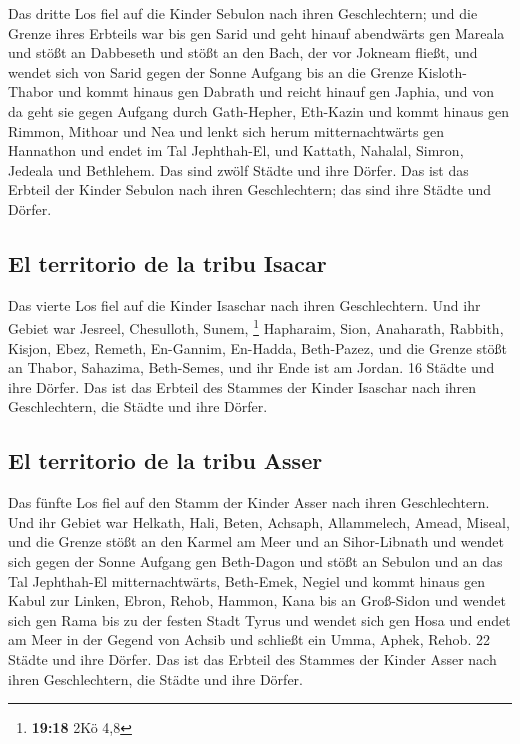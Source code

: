  Das dritte Los fiel auf die Kinder Sebulon nach ihren
Geschlechtern; und die Grenze ihres Erbteils war bis gen Sarid
 und geht hinauf abendwärts gen Mareala und stößt an
Dabbeseth und stößt an den Bach, der vor Jokneam fließt, 
und wendet sich von Sarid gegen der Sonne Aufgang bis an die Grenze
Kisloth-Thabor und kommt hinaus gen Dabrath und reicht hinauf gen
Japhia,  und von da geht sie gegen Aufgang durch
Gath-Hepher, Eth-Kazin und kommt hinaus gen Rimmon, Mithoar und Nea
 und lenkt sich herum mitternachtwärts gen Hannathon und
endet im Tal Jephthah-El,  und Kattath, Nahalal, Simron,
Jedeala und Bethlehem. Das sind zwölf Städte und ihre Dörfer.
 Das ist das Erbteil der Kinder Sebulon nach ihren
Geschlechtern; das sind ihre Städte und Dörfer.

\hypertarget{el-territorio-de-la-tribu-isacar}{%
\subsection{El territorio de la tribu
Isacar}\label{el-territorio-de-la-tribu-isacar}}

 Das vierte Los fiel auf die Kinder Isaschar nach ihren
Geschlechtern.  Und ihr Gebiet war Jesreel, Chesulloth,
Sunem, \footnote{\textbf{19:18} 2Kö 4,8}  Hapharaim,
Sion, Anaharath,  Rabbith, Kisjon, Ebez, 
Remeth, En-Gannim, En-Hadda, Beth-Pazez,  und die Grenze
stößt an Thabor, Sahazima, Beth-Semes, und ihr Ende ist am Jordan. 16
Städte und ihre Dörfer.  Das ist das Erbteil des Stammes
der Kinder Isaschar nach ihren Geschlechtern, die Städte und ihre
Dörfer.

\hypertarget{el-territorio-de-la-tribu-asser}{%
\subsection{El territorio de la tribu
Asser}\label{el-territorio-de-la-tribu-asser}}

 Das fünfte Los fiel auf den Stamm der Kinder Asser nach
ihren Geschlechtern.  Und ihr Gebiet war Helkath, Hali,
Beten, Achsaph,  Allammelech, Amead, Miseal, und die
Grenze stößt an den Karmel am Meer und an Sihor-Libnath 
und wendet sich gegen der Sonne Aufgang gen Beth-Dagon und stößt an
Sebulon und an das Tal Jephthah-El mitternachtwärts, Beth-Emek, Negiel
und kommt hinaus gen Kabul zur Linken,  Ebron, Rehob,
Hammon, Kana bis an Groß-Sidon  und wendet sich gen Rama
bis zu der festen Stadt Tyrus und wendet sich gen Hosa und endet am Meer
in der Gegend von Achsib  und schließt ein Umma, Aphek,
Rehob. 22 Städte und ihre Dörfer.  Das ist das Erbteil
des Stammes der Kinder Asser nach ihren Geschlechtern, die Städte und
ihre Dörfer.

